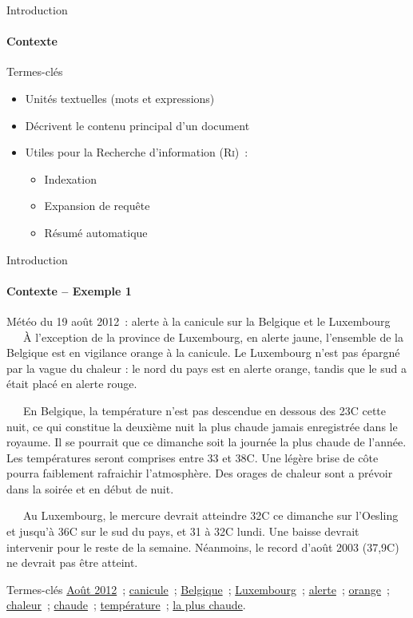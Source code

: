 \begin{frame}{Introduction}\framesubtitle{Contexte}
  \begin{block}{Termes-clés}
    \begin{itemize}
      \item{Unités textuelles (mots et expressions)}
      \item{Décrivent le contenu principal d'un document}
      \item{Utiles pour la Recherche d'information (\textsc{Ri})~:}
      \begin{itemize}
        \item{Indexation}
        \item{Expansion de requête}
        \item{Résumé automatique}
      \end{itemize}
    \end{itemize}
  \end{block}
\end{frame}

\begin{frame}{Introduction}\framesubtitle{Contexte -- Exemple 1}
  \begin{exampleblock}{\small
    Météo du 19 août 2012~: alerte à la canicule sur la Belgique et le
    Luxembourg
  }\justifying\small
    ~~~À l'exception de la province de Luxembourg, en alerte jaune, l'ensemble
    de la Belgique est en vigilance orange à la canicule. Le Luxembourg n'est
    pas épargné par la vague du chaleur : le nord du pays est en alerte
    orange, tandis que le sud a était placé en alerte rouge.

    ~~~En Belgique, la température n'est pas descendue en dessous des
    23\degre{}C cette nuit, ce qui constitue la deuxième nuit la plus chaude
    jamais enregistrée dans le royaume. Il se pourrait que ce dimanche soit la
    journée la plus chaude de l'année. Les températures seront comprises entre
    33 et 38\degre{}C. Une légère brise de côte pourra faiblement rafraichir
    l'atmosphère. Des orages de chaleur sont a prévoir dans la soirée et en
    début de nuit.

    ~~~Au Luxembourg, le mercure devrait atteindre 32\degre{}C ce dimanche sur
    l'Oesling et jusqu'à 36\degre{}C sur le sud du pays, et 31 à 32\degre{}C
    lundi. Une baisse devrait intervenir pour le reste de la semaine.
    Néanmoins, le record d'août 2003 (37,9\degre{}C) ne devrait pas être
    atteint.

    \begin{exampleblock}{\small Termes-clés}\justifying\small
      \underline{Août 2012}~; \underline{canicule}~;
      \underline{Belgique}~; \underline{Luxembourg}~; \underline{alerte}~;
      \underline{orange}~; \underline{chaleur}~; \underline{chaude}~;
      \underline{température}~; \underline{la plus chaude}.
    \end{exampleblock}
  \end{exampleblock}
\end{frame}


